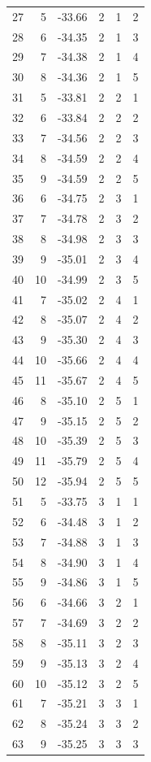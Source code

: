 \begin{longtable}{lrrrrr}
27 & 5 & -33.66 & 2 & 1 & 2 \\
28 & 6 & -34.35 & 2 & 1 & 3 \\
29 & 7 & -34.38 & 2 & 1 & 4 \\
30 & 8 & -34.36 & 2 & 1 & 5 \\
31 & 5 & -33.81 & 2 & 2 & 1 \\
32 & 6 & -33.84 & 2 & 2 & 2 \\
33 & 7 & -34.56 & 2 & 2 & 3 \\
34 & 8 & -34.59 & 2 & 2 & 4 \\
35 & 9 & -34.59 & 2 & 2 & 5 \\
36 & 6 & -34.75 & 2 & 3 & 1 \\
37 & 7 & -34.78 & 2 & 3 & 2 \\
38 & 8 & -34.98 & 2 & 3 & 3 \\
39 & 9 & -35.01 & 2 & 3 & 4 \\
40 & 10 & -34.99 & 2 & 3 & 5 \\
41 & 7 & -35.02 & 2 & 4 & 1 \\
42 & 8 & -35.07 & 2 & 4 & 2 \\
43 & 9 & -35.30 & 2 & 4 & 3 \\
44 & 10 & -35.66 & 2 & 4 & 4 \\
45 & 11 & -35.67 & 2 & 4 & 5 \\
46 & 8 & -35.10 & 2 & 5 & 1 \\
47 & 9 & -35.15 & 2 & 5 & 2 \\
48 & 10 & -35.39 & 2 & 5 & 3 \\
49 & 11 & -35.79 & 2 & 5 & 4 \\
50 & 12 & -35.94 & 2 & 5 & 5 \\
51 & 5 & -33.75 & 3 & 1 & 1 \\
52 & 6 & -34.48 & 3 & 1 & 2 \\
53 & 7 & -34.88 & 3 & 1 & 3 \\
54 & 8 & -34.90 & 3 & 1 & 4 \\
55 & 9 & -34.86 & 3 & 1 & 5 \\
56 & 6 & -34.66 & 3 & 2 & 1 \\
57 & 7 & -34.69 & 3 & 2 & 2 \\
58 & 8 & -35.11 & 3 & 2 & 3 \\
59 & 9 & -35.13 & 3 & 2 & 4 \\
60 & 10 & -35.12 & 3 & 2 & 5 \\
61 & 7 & -35.21 & 3 & 3 & 1 \\
62 & 8 & -35.24 & 3 & 3 & 2 \\
63 & 9 & -35.25 & 3 & 3 & 3 \\

\end{longtable}
